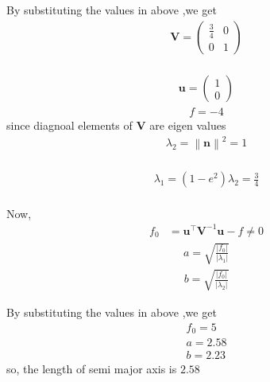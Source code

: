 \documentclass[10pt, a4paper]{article}
\providecommand{\norm}[1]{\left\lVert#1\right\rVert}
\newcommand{\myvec}[1]{\ensuremath{\begin{pmatrix}#1\end{pmatrix}}}
\let\vec\mathbf
\begin{document}
\textbf{} By substituting the values in above ,we get
\begin{align}
			 \vec{V}  = \myvec{\frac{3}{4}& 0
			    \\
			    0 & 1 }  
		    \end{align}
\\
\begin{align}
  \vec{u} = \myvec{1\\0}
\end{align}
\begin{align}
     f =-4
\end{align}
 \textbf{} since diagnoal elements of \textbf{V} are eigen values
\\
  \begin{align}
			    \lambda_2 = \norm{\vec{n}}^2= 1
		    \end{align}
		    \\
		     \begin{align}
			    \lambda_1 = \textbf{}(1-e^2)\lambda_2=\frac{3}{4}
		    \end{align}
		    \\
		   
\textbf{} Now, 
\begin{align}
		      f_0 &=\vec{u}^{\top}\vec{V}^{-1}\vec{u} -f \ne 0
		 \end{align}
   	    \begin{align}
		a = \sqrt{\frac{|f_0|}{|\lambda_1|}}
		    \end{align}
		     \begin{align}
		b = \sqrt{\frac{|f_0|}{|\lambda_2|}}
		    \end{align}
		 
\textbf{} By substituting the values in above ,we get
\begin{align}
       f_0=5
        \\
		a =2.58
		\\
		b=2.23
\end{align}
\textbf{} so, the length of semi major axis is $2.58$	
\end{document}
